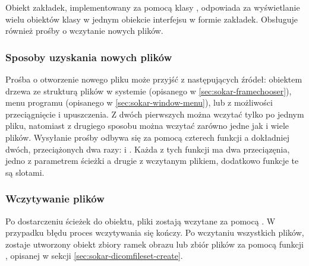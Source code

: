 \label{sec:sokar-dicomtabs}

\par
Obiekt zakładek, implementowany za pomocą klasy , odpowiada za wyświetlanie wielu obiektów klasy  w jednym obiekcie interfejsu w formie zakładek.
Obsługuje również prośby o wczytanie nowych plików.

\subsubsection{Sposoby uzyskania nowych plików}

\par
Prośba o otworzenie nowego pliku może przyjść z następujących źródeł: obiektem drzewa ze strukturą plików w systemie (opisanego w \ref{sec:sokar-framechooser}), menu programu (opisanego w \ref{sec:sokar-window-menu}), lub z możliwości przeciągnięcie i upuszczenia.
Z dwóch pierwszych można wczytać tylko po jednym pliku, natomiast z drugiego sposobu można wczytać zarówno jedne jak i wiele plików.
Wysyłanie prośby odbywa się za pomocą czterech funkcji a dokładniej dwóch, przeciążonych dwa razy:  i .
Każda z tych funkcji ma dwa przeciązęnia, jedno z parametrem ścieżki a drugie z wczytanym plikiem, dodatkowo funkcje te są slotami.

\subsubsection{Wczytywanie plików}

\par
Po dostarczeniu ścieżek do obiektu, pliki zostają wczytane za pomocą .
W przypadku błędu proces wczytywania się kończy.
Po wczytaniu wszystkich plików, zostaje utworzony obiekt zbiory ramek obrazu lub zbiór plików \DICOM za pomocą funkcji , opisanej w sekcji \ref{sec:sokar-dicomfileset-create}.
